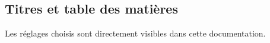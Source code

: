 \documentclass{main}
\begin{document}
\subsection{Titres et table des matières}

Les réglages choisis sont directement visibles dans cette documentation.
\end{document}
